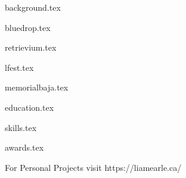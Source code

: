 \documentclass[11pt]{article}
\begin{document}
{background.tex}


{bluedrop.tex}

{retrievium.tex}

{lfest.tex}

{memorialbaja.tex}


{education.tex}


{skills.tex}


{awards.tex}

{For Personal Projects visit https://liamearle.ca/}
\end{document}
